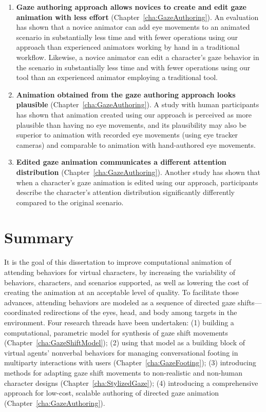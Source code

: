 \begin{enumerate}
\item \textbf{Gaze authoring approach allows novices to create and edit gaze animation with less effort} (Chapter~\ref{cha:GazeAuthoring}). An evaluation has shown that a novice animator can add eye movements to an animated scenario in substantially less time and with fewer operations using our approach than experienced animators working by hand in a traditional workflow. Likewise, a novice animator can edit a character's gaze behavior in the scenario in substantially less time and with fewer operations using our tool than an experienced animator employing a traditional tool.
\item \textbf{Animation obtained from the gaze authoring approach looks plausible} (Chapter~\ref{cha:GazeAuthoring}). A study with human participants has shown that animation created using our approach is perceived as more plausible than having no eye movements, and its plausibility may also be superior to animation with recorded eye movements (using eye tracker cameras) and comparable to animation with hand-authored eye movements.
\item \textbf{Edited gaze animation communicates a different attention distribution} (Chapter~\ref{cha:GazeAuthoring}). Another study has shown that when a character's gaze animation is edited using our approach, participants describe the character's attention distribution significantly differently compared to the original scenario.
\end{enumerate}


\section{Summary}

It is the goal of this dissertation to improve computational animation of attending behaviors for virtual characters, by increasing the variability of behaviors, characters, and scenarios supported, as well as lowering the cost of creating the animation at an acceptable level of quality. To facilitate those advances, attending behaviors are modeled as a sequence of directed gaze shifts---coordinated redirections of the eyes, head, and body among targets in the environment. Four research threads have been undertaken: (1) building a computational, parametric model for synthesis of gaze shift movements (Chapter~\ref{cha:GazeShiftModel}); (2) using that model as a building block of virtual agents' nonverbal behaviors for managing conversational footing in multiparty interactions with users (Chapter~\ref{cha:GazeFooting}); (3) introducing methods for adapting gaze shift movements to non-realistic and non-human character designs (Chapter~\ref{cha:StylizedGaze}); (4) introducing a comprehensive approach for low-cost, scalable authoring of directed gaze animation (Chapter~\ref{cha:GazeAuthoring}).
